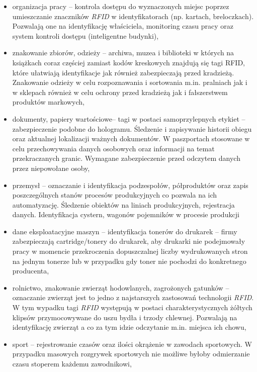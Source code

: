 \begin{itemize}
\begin{itemize}
\begin{itemize}
	\item organizacja pracy – kontrola dostępu do wyznaczonych miejsc poprzez umieszczanie znaczników \emph{RFID} w identyfikatorach (np. kartach, breloczkach). Pozwalają one na identyfikację właściciela, monitoring czasu pracy oraz system kontroli dostępu (inteligentne budynki),

	\item znakowanie zbiorów, odzieży – archiwa, muzea i biblioteki w których na książkach coraz częściej zamiast kodów kreskowych znajdują się tagi RFID, które ułatwiają identyfikacje jak również zabezpieczają przed kradzieżą. Znakowanie odzieży w celu rozpoznawania i sortowania m.in. pralniach jak i w sklepach również w celu ochrony przed kradzieżą jak i fałszerstwem produktów markowych,
 	
 	\item dokumenty, papiery wartościowe– tagi w postaci samoprzylepnych etykiet – zabezpieczenie podobne do hologramu. Śledzenie i zapisywanie historii obiegu oraz aktualnej lokalizacji ważnych dokumentów.  W paszportach stosowane w celu przechowywania danych osobowych oraz informacji na temat przekraczanych granic. Wymagane zabezpieczenie przed odczytem danych przez niepowołane osoby,
	
	\item przemysł – oznaczanie i  identyfikacja podzespołów, półproduktów oraz zapis poszczególnych stanów procesów produkcyjnych co pozwala na ich automatyzację. Śledzenie obiektów na liniach produkcyjnych, rejestracja danych. Identyfikacja cystern, wagonów pojemników w procesie produkcji
	
	\item dane eksploatacyjne maszyn – identyfikacja tonerów do drukarek – firmy zabezpieczają cartridge/tonery do drukarek, aby drukarki nie podejmowały pracy w momencie przekroczenia dopuszczalnej liczby wydrukowanych stron na jednym tonerze lub w przypadku gdy toner nie pochodzi do konkretnego producenta, 
	
	\item rolnictwo, znakowanie zwierząt hodowlanych, zagrożonych gatunków –oznaczanie zwierząt jest to jedno z najstarszych zastosowań technologii \emph{RFID}. W tym wypadku tagi \emph{RFID} występują w postaci charakterystycznych żółtych klipsów przymocowywane do uszu bydła i trzody chlewnej. Pozwalają na identyfikację zwierząt a co za tym idzie odczytanie m.in. miejsca ich chowu,
	
	\item sport – rejestrowanie czasów oraz ilości okrążenie w zawodach sportowych.  W przypadku masowych rozgrywek sportowych  nie możliwe byłoby odmierzanie czasu stoperem każdemu zawodnikowi,
	

\end{itemize}
\end{itemize}
\end{itemize}
